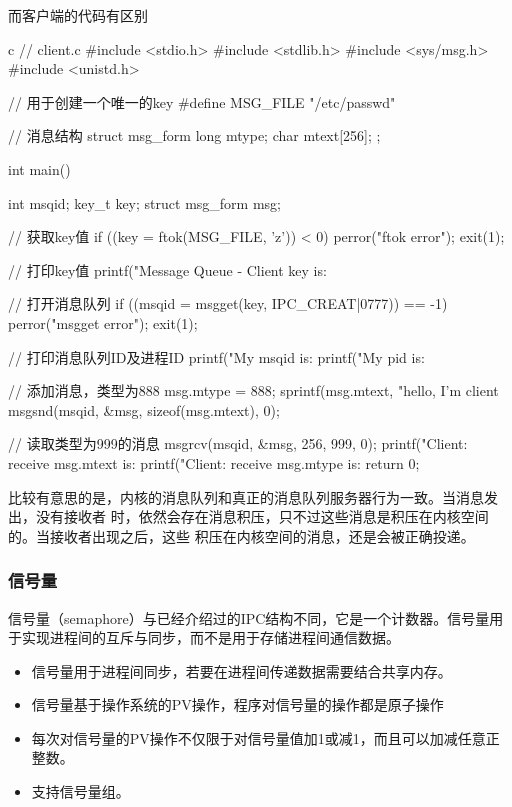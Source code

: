 而客户端的代码有区别
\begin{code-block}{c}
// client.c
#include <stdio.h>
#include <stdlib.h>
#include <sys/msg.h>
#include <unistd.h>

// 用于创建一个唯一的key
#define MSG_FILE "/etc/passwd"

// 消息结构
struct msg_form {
        long mtype;
        char mtext[256];
};

int main()
{
        int msqid;
        key_t key;
        struct msg_form msg;

        // 获取key值
        if ((key = ftok(MSG_FILE, 'z')) < 0)
        {
                perror("ftok error");
                exit(1);
        }

        // 打印key值
        printf("Message Queue - Client key is: %

        // 打开消息队列
        if ((msqid = msgget(key, IPC_CREAT|0777)) == -1)
        {
                perror("msgget error");
                exit(1);
        }

        // 打印消息队列ID及进程ID
        printf("My msqid is: %
        printf("My pid is: %

        // 添加消息，类型为888
        msg.mtype = 888;
        sprintf(msg.mtext, "hello, I'm client %
        msgsnd(msqid, &msg, sizeof(msg.mtext), 0);

        // 读取类型为999的消息
        msgrcv(msqid, &msg, 256, 999, 0);
        printf("Client: receive msg.mtext is: %
        printf("Client: receive msg.mtype is: %
        return 0;
}
\end{code-block}

比较有意思的是，内核的消息队列和真正的消息队列服务器行为一致。当消息发出，没有接收者
时，依然会存在消息积压，只不过这些消息是积压在内核空间的。当接收者出现之后，这些
积压在内核空间的消息，还是会被正确投递。

\subsubsection{信号量}
信号量（semaphore）与已经介绍过的IPC结构不同，它是一个计数器。信号量用于实现进程间的互斥与同步，而不是用于存储进程间通信数据。
\begin{itemize}
    \item 信号量用于进程间同步，若要在进程间传递数据需要结合共享内存。
    \item 信号量基于操作系统的PV操作，程序对信号量的操作都是原子操作
    \item 每次对信号量的PV操作不仅限于对信号量值加1或减1，而且可以加减任意正整数。
    \item 支持信号量组。
\end{itemize}

